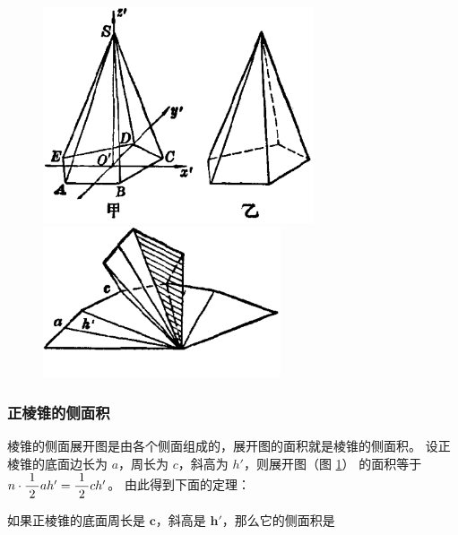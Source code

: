 \begin{enhancedline}
\begin{figure}[htbp]
    \centering
    \begin{minipage}[b]{8cm}
        \centering
        \includegraphics[width=8cm]{../pic/ltjh-ch2-17.png}
        \caption{}\label{fig:ltjh-2-17}
    \end{minipage}
    \qquad
    \begin{minipage}[b]{7cm}
        \centering
        \includegraphics[width=7cm]{../pic/ltjh-ch2-18.png}
        \caption{}\label{fig:ltjh-2-18}
    \end{minipage}
\end{figure}

\subsubsection{正棱锥的侧面积}

棱锥的侧面展开图是由各个侧面组成的，展开图的面积就是棱锥的侧面积。
设正棱锥的底面边长为 $a$，周长为 $c$，斜高为 $h'$，则展开图（图 \ref{fig:ltjh-2-18}）
的面积等于 $n \cdot \dfrac{\; 1 \;}{2} ah' = \dfrac{\; 1 \;}{2} ch'$。
由此得到下面的定理：

\begin{dingli}
    如果正棱锥的底面周长是 $\bm{c}$，斜高是 $\bm{h'}$，那么它的侧面积是
    \begin{center}
    \end{center}
\end{dingli}


\end{enhancedline}
